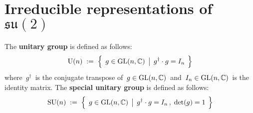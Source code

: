

\section{Irreducible representations of \,$\mathfrak{su}(2)$}
\setcounter{theorem}{0}
\setcounter{equation}{0}


\renewcommand{\theenumi}{\roman{enumi}}
\renewcommand{\labelenumi}{\textnormal{(\theenumi)}$\;\;$}


\begin{definition}
\mbox{}
\vskip 0.1cm
\noindent
The \textbf{unitary group} is defined as follows:
\begin{equation*}
\textnormal{U}(n)
\; := \;
	\left\{\;\,
		g \overset{{\color{white}.}}{\in} \textnormal{GL}(n,\C)
		\;\left\vert\;\,
			g^{\dagger} \cdot g = I_{n}
			\right.
		\;\right\}
\end{equation*}
where \,$g^{\dagger}$\, is the conjugate transpose of
\,$g \in \textnormal{GL}(n,\mathbb{C})$\,
and
\,$I_{n} \in \textnormal{GL}(n,\mathbb{C})$\,
is the identity matrix.
\vskip 0.1cm
\noindent
The \textbf{special unitary group} is defined as follows:
\begin{equation*}
\textnormal{SU}(n)
\; := \;
	\left\{\;\,
		g \overset{{\color{white}.}}{\in} \textnormal{GL}(n,\C)
		\;\left\vert\;\,
			g^{\dagger} \cdot g = I_{n}\,,
			\;
			\textnormal{det}(g) = 1
			\right.
		\;\right\}
\end{equation*}
\end{definition}

